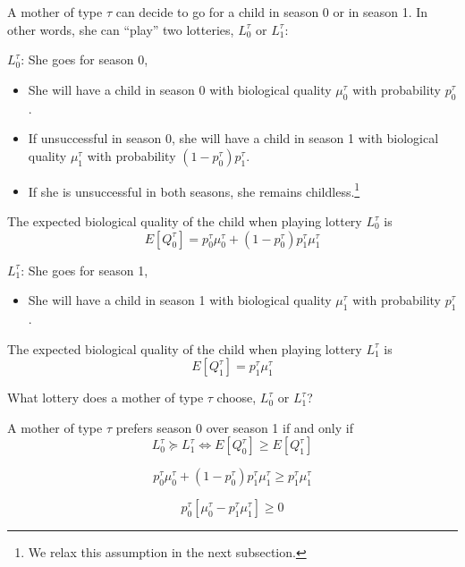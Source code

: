 \documentclass[a4paper, 11 pt]{article}
\theoremstyle{plain}
\begin{document}
\begin{spacing}{1.2}
A mother of type $\tau$ can decide to go for a child in season 0 or in season 1. In other words, she can ``play'' two lotteries, $L_0^{\tau}$ or $L_1^{\tau}$:

$L_0^{\tau}$: She goes for season 0,
\begin{itemize}
  \item She will have a child in season 0 with biological quality $\mu_0^{\tau}$ with probability $p_0^{\tau}$.
  \item If unsuccessful in season 0, she will have a child in season 1 with biological quality $\mu_1^{\tau}$ with probability $(1-p_0^{\tau})p_1^{\tau}$.
  \item If she is unsuccessful in both seasons, she remains childless.\footnote{We relax this assumption in the next subsection.}
\end{itemize}
The expected biological quality of the child when playing lottery $L_0^{\tau}$ is
\begin{equation}\label{A1}
    E[Q_0^{\tau}]=p_0^{\tau} \mu_0^{\tau} + (1 - p_0^{\tau})p_1^{\tau} \mu_1^{\tau}
\end{equation}

$L_1^{\tau}$: She goes for season 1,
\begin{itemize}
  \item She will have a child in season 1 with biological quality $\mu_1^{\tau}$ with probability $p_1^{\tau}$.
\end{itemize}
The expected biological quality of the child when playing lottery $L_1^{\tau}$ is
\begin{equation}\label{A2}
    E[Q_1^{\tau}]=p_1^{\tau} \mu_1^{\tau}
\end{equation}

What lottery does a mother of type $\tau$ choose, $L_0^{\tau}$ or $L_1^{\tau}$?

A mother of type $\tau$ prefers season 0 over season 1 if and only if
\begin{equation}\label{A3}
    L_0^{\tau} \succeq L_1^{\tau} \Leftrightarrow E[Q_0^{\tau}] \geq E[Q_1^{\tau}]
\end{equation}

\begin{equation}\label{A4}
     p_0^{\tau} \mu_0^{\tau} + (1 - p_0^{\tau})p_1^{\tau} \mu_1^{\tau} \geq p_1^{\tau} \mu_1^{\tau}
\end{equation}


\begin{equation}\label{A5}
     p_0^{\tau} [ \mu_0^{\tau} - p_1^{\tau} \mu_1^{\tau}] \geq 0
\end{equation}



\end{spacing}
\end{document}
